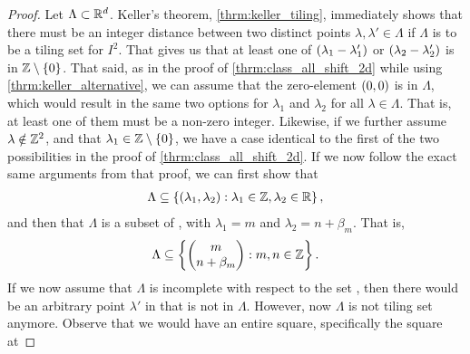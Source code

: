 \documentclass[../thesis.tex]{subfiles}
\begin{document}
\begin{proof}
    Let $\Lambda \subset \mathbb{R}^d$. Keller's theorem, \cref{thrm:keller_tiling}, immediately shows that there must be an integer distance between two distinct points $\lambda,\lambda' \in \Lambda$ if $\Lambda$ is to be a tiling set for $I^2$. That gives us that at least one of $(\lambda_1-\lambda_1')$ or $(\lambda_2-\lambda_2')$ is in $\mathbb{Z}\setminus\{0\}$. That said, as in the proof of \cref{thrm:class_all_shift_2d} while using \cref{thrm:keller_alternative}, we can assume that the zero-element $(0,0)$ is in $\Lambda$, which would result in the same two options for $\lambda_1$ and $\lambda_2$ for all $\lambda\in \Lambda$. That is, at least one of them must be a non-zero integer. Likewise, if we further assume $\lambda\notin \mathbb{Z}^2$, and that $\lambda_1 \in\mathbb{Z}\setminus\{0\}$, we have a case identical to the first of the two possibilities in the proof of \cref{thrm:class_all_shift_2d}. If we now follow the exact same arguments from that proof, we can first show that 
    \begin{align*}  %
        \Lambda \subseteq \braqMed{ \bracMed{\lambda_1, \lambda_2} : \lambda_1 \in \Z, \lambda_2 \in \R},
    \end{align*}
    and then that $\Lambda$ is a subset of , with $\lambda_1 = m$ and $\lambda_2 = n+\beta_m$. That is,
    \begin{equation*}  %
        \Lambda \subseteq \braqMed{\begin{pmatrix} m \\ n+\beta_m\end{pmatrix} : m,n \in \Z}.
    \end{equation*}
    If we now assume that $\Lambda$ is incomplete with respect to the set , then there would be an arbitrary point $\lambda'$ in  that is not in $\Lambda$. However, now $\Lambda$ is not tiling set anymore. Observe that we would have an entire square, specifically the square at

\end{proof}
\end{document}
